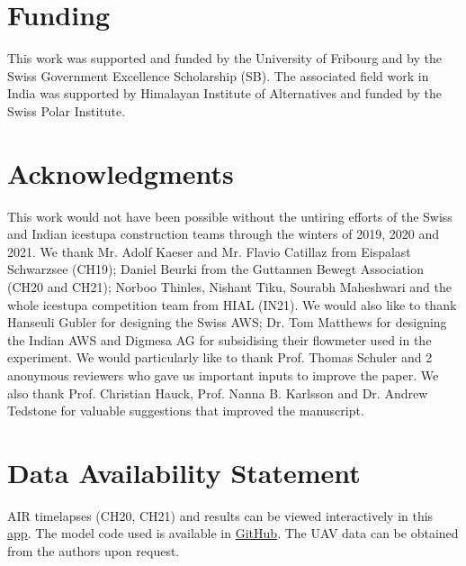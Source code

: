 \documentclass[utf8]{frontiersSCNS} %
\begin{document}
\section*{Funding} This work was supported and funded by the University of Fribourg and by the Swiss Government
Excellence Scholarship (SB). The associated field work in India was supported by Himalayan Institute of
Alternatives and funded by the Swiss Polar Institute.

\section*{Acknowledgments} This work would not have been possible without the untiring efforts of the Swiss and
Indian icestupa construction teams through the winters of 2019, 2020 and 2021. We thank Mr. Adolf Kaeser and Mr.
Flavio Catillaz from Eispalast Schwarzsee (CH19); Daniel Beurki from the Guttannen Bewegt Association (CH20 and
CH21); Norboo Thinles, Nishant Tiku, Sourabh Maheshwari and the whole icestupa competition team from HIAL (IN21).
We would also like to thank Hanseuli Gubler for designing the Swiss AWS; Dr. Tom Matthews for designing the Indian AWS
and Digmesa AG for subsidising their flowmeter used in the experiment.  We would particularly like to thank
Prof. Thomas Schuler and 2 anonymous reviewers who gave us important inputs to improve the paper. We also
thank Prof. Christian Hauck, Prof.  Nanna B. Karlsson and Dr.  Andrew Tedstone for valuable suggestions that
improved the manuscript.

\section*{Data Availability Statement} AIR timelapses (CH20, CH21) and results can be viewed interactively in this
\href{https://share.streamlit.io/gayashiva/air_model/src/visualization/webApp.py}{app}.  The model code used is
available in \href{https://github.com/Gayashiva/air_model}{GitHub}. The UAV data can be obtained from the authors
upon request.

 
\end{document}
